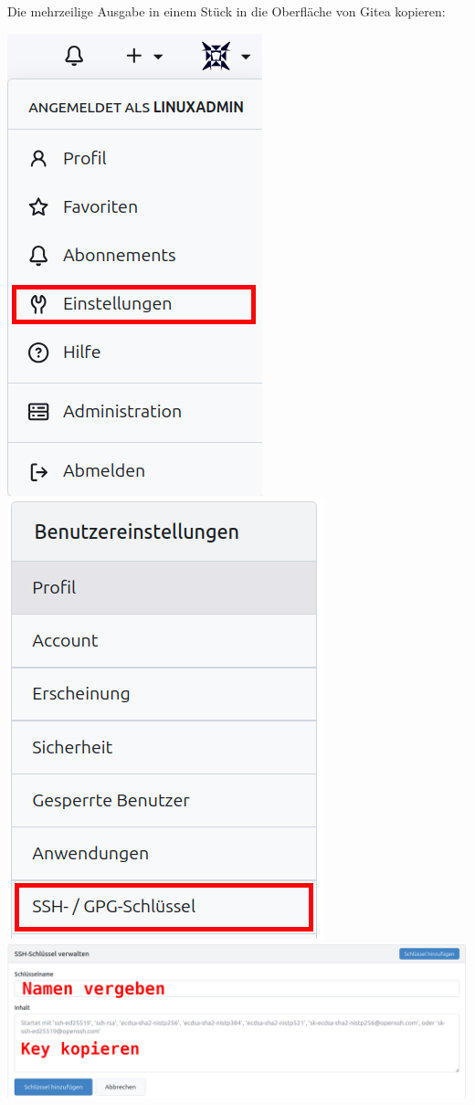 \documentclass[
  letterpaper,
  DIV=11]{scrreprt}
\begin{document}
Die mehrzeilige Ausgabe in einem Stück in die Oberfläche von Gitea
kopieren:

\includegraphics{bilder/inst/key1.png}
\includegraphics{bilder/inst/key2.png}
\includegraphics{bilder/inst/key3.png}
\end{document}
